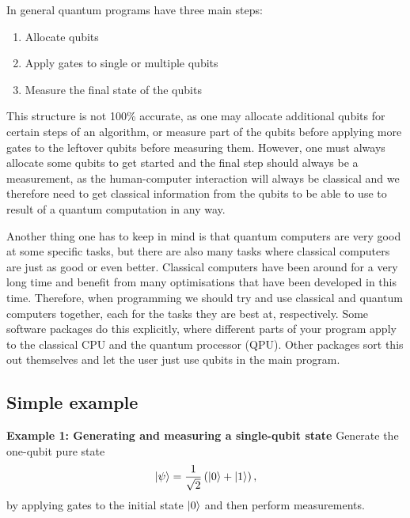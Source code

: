 In general quantum programs have three main steps:
\begin{enumerate}
    \item Allocate qubits
    \item Apply gates to single or multiple qubits
    \item Measure the final state of the qubits
\end{enumerate}
This structure is not 100\% accurate, as one may allocate additional qubits for certain steps of an algorithm, or measure part of the qubits before applying more gates to the leftover qubits before measuring them. However, one must always allocate some qubits to get started and the final step should always be a measurement, as the human-computer interaction will always be classical and we therefore need to get classical information from the qubits to be able to use to result of a quantum computation in any way.

Another thing one has to keep in mind is that quantum computers are very good at some specific tasks, but there are also many tasks where classical computers are just as good or even better. Classical computers have been around for a very long time and benefit from many optimisations that have been developed in this time. Therefore, when programming we should try and use classical and quantum computers together, each for the tasks they are best at, respectively. Some software packages do this explicitly, where different parts of your program apply to the classical CPU and the quantum processor (QPU). Other packages sort this out themselves and let the user just use qubits in the main program.

\subsection{Simple example}

\begin{tcolorbox}[standard jigsaw,
    opacityback=0,  %
    boxrule=0.5pt,label={example0000001}]
    {\bf Example 1: Generating and measuring a single-qubit state}
    \tcbline
    Generate the one-qubit pure state 
    \begin{align*}
    \left\vert{\psi}\right\rangle=\frac{1}{\sqrt{2}}\left(\left\vert{0}\right\rangle+\left\vert{1}\right\rangle\right),
    \end{align*}
    by applying gates to the initial state $\left\vert{0}\right\rangle$ and then perform measurements.
\end{tcolorbox}



